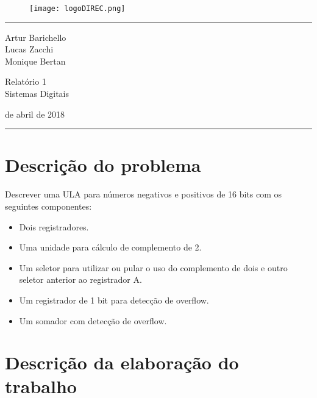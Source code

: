 \documentclass[a4paper]{article}
\begin{document}

\begin{figure}[h!]
\centering
\texttt{[image: logoDIREC.png]}
\end{figure}

\fancyhead[C]{}
\hrule \medskip %
\begin{minipage}{0.295\textwidth} 
\raggedright
\footnotesize

Artur Barichello \hfill\\   
Lucas Zacchi \hfill\\   
Monique Bertan \hfill\\

\end{minipage}
\begin{minipage}{0.4\textwidth} 
\centering 
\large 
Relatório 1\\ 
\normalsize 
Sistemas Digitais\\
\end{minipage}
\begin{minipage}{0.295\textwidth} 
 de abril de 2018\hfill\\
\end{minipage}
\medskip\hrule 
\bigskip

\section{\textbf{Descrição do problema}}

Descrever uma ULA para números negativos e positivos de 16 bits com os seguintes componentes:
\begin{itemize}
\item Dois registradores.
\item Uma unidade para cálculo de complemento de 2.
\item Um seletor para utilizar ou pular o uso do complemento de dois e outro seletor anterior ao registrador A.
\item Um registrador de 1 bit para detecção de overflow.
\item Um somador com detecção de overflow.
\end{itemize}

\smallskip

\section{\textbf{Descrição da elaboração do trabalho}}
\end{document}

